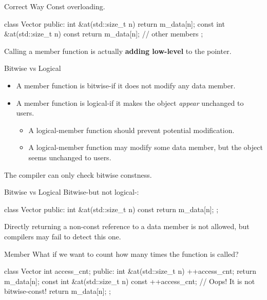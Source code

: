 \documentclass{beamer}
\begin{document}
\begin{frame}[fragile]{Correct Way}
    Const overloading.
    \begin{cpp}
class Vector {
 public:
  int &at(std::size_t n) {
    return m_data[n];
  }
  const int &at(std::size_t n) const {
    return m_data[n];
  }
  // other members
};
    \end{cpp}
    Calling a \const member function is actually \textbf{adding low-level } to the  pointer.
\end{frame}

\begin{frame}{Bitwise \const vs Logical \const}
    \begin{itemize}
        \item A member function is bitwise-\const if it does not modify any data member.
        \item A member function is logical-\const if it makes the object \textit{appear} unchanged to users.
        \begin{itemize}
            \item A logical-\const member function should prevent potential modification.
            \item A logical-\const member function may modify some data member, but the object seems unchanged to users.
        \end{itemize}
    \end{itemize}
    The compiler can only check bitwise constness.
\end{frame}

\begin{frame}[fragile]{Bitwise \const vs Logical \const}
    Bitwise-\const but not logical-\const:
    \begin{cpp}
class Vector {
 public:
  int &at(std::size_t n) const {
    return m_data[n];
  }
};
    \end{cpp}
    Directly returning a non-const reference to a data member is not allowed, but compilers may fail to detect this one.
\end{frame}

\begin{frame}[fragile]{ Member}
    What if we want to count how many times the function is called?
    \begin{cpp}
class Vector {
  int access_cnt;
 public:
  int &at(std::size_t n) {
    ++access_cnt;
    return m_data[n];
  }
  const int &at(std::size_t n) const {
    ++access_cnt;   // Oops! It is not bitwise-const!
    return m_data[n];
  }
};
    \end{cpp}
\end{frame}
\end{document}
